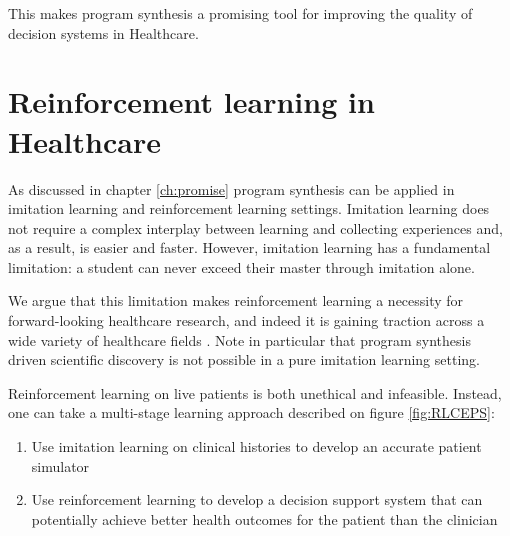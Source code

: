 This makes program synthesis a promising tool for improving the quality of decision systems in Healthcare.

\section{Reinforcement learning in Healthcare}
\label{sec:rl-health}

As discussed in chapter \ref{ch:promise} program synthesis can be applied in imitation learning and reinforcement learning settings.
Imitation learning does not require a complex interplay between learning and collecting experiences and, as a result, is easier and faster.
However, imitation learning has a fundamental limitation: a student can never exceed their master through imitation alone.

We argue that this limitation makes reinforcement learning a necessity for forward-looking healthcare research, and indeed it is gaining traction across a wide variety of healthcare fields \cite{yuReinforcementLearningHealthcare2021}.
Note in particular that program synthesis driven scientific discovery is not possible in a pure imitation learning setting.

Reinforcement learning on live patients is both unethical and infeasible.
Instead, one can take a multi-stage learning approach described on figure \ref{fig:RLCEPS}: 
\begin{enumerate}
  \item Use imitation learning on clinical histories to develop an accurate patient simulator
  \item Use reinforcement learning to develop a decision support system that can potentially achieve better health outcomes for the patient than the clinician
\end{enumerate}

